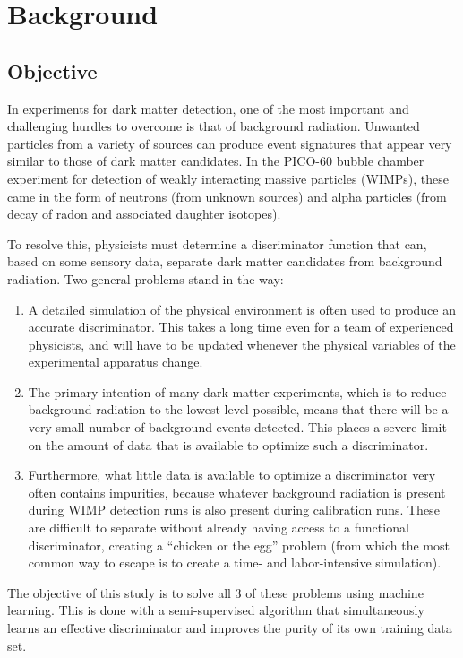 \documentclass[10pt]{article}
\begin{document}
\section{Background}

\subsection{Objective}

In experiments for dark matter detection, one of the most important and challenging hurdles to overcome is that of background radiation. Unwanted particles from a variety of sources can produce event signatures that appear very similar to those of dark matter candidates. In the PICO-60 bubble chamber experiment for detection of weakly interacting massive particles (WIMPs), these came in the form of neutrons (from unknown sources) and alpha particles (from decay of radon and associated daughter isotopes).

To resolve this, physicists must determine a discriminator function that can, based on some sensory data, separate dark matter candidates from background radiation. Two general problems stand in the way:

\begin{enumerate}
    \item A detailed simulation of the physical environment is often used to produce an accurate discriminator. This takes a long time even for a team of experienced physicists, and will have to be updated whenever the physical variables of the experimental apparatus change.
    \item The primary intention of many dark matter experiments, which is to reduce background radiation to the lowest level possible, means that there will be a very small number of background events detected. This places a severe limit on the amount of data that is available to optimize such a discriminator.
    \item Furthermore, what little data is available to optimize a discriminator very often contains impurities, because whatever background radiation is present during WIMP detection runs is also present during calibration runs. These are difficult to separate without already having access to a functional discriminator, creating a ``chicken or the egg'' problem (from which the most common way to escape is to create a time- and labor-intensive simulation).
\end{enumerate}

The objective of this study is to solve all 3 of these problems using machine learning. This is done with a semi-supervised algorithm that simultaneously learns an effective discriminator and improves the purity of its own training data set.
\end{document}
